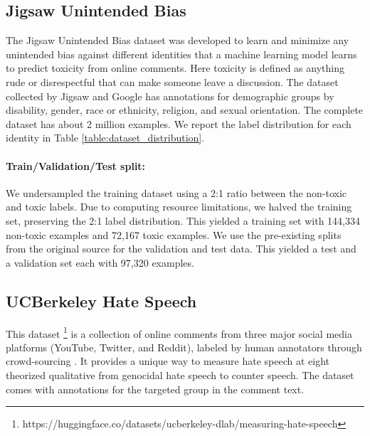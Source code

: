 \documentclass[11pt]{article} %
\begin{document}
\subsection{Jigsaw Unintended Bias}
The Jigsaw Unintended Bias dataset was developed to learn and minimize any unintended bias against different identities that a machine learning model learns to predict toxicity \cite{jigsaw-unintended-bias-in-toxicity-classification} from online comments. Here toxicity is defined as anything rude or disrespectful that can make someone leave a discussion.  The dataset collected by Jigsaw and Google has annotations for demographic groups by disability, gender, race or ethnicity, religion, and sexual orientation. The complete dataset has about 2 million examples. We report the label distribution for each identity in Table \ref{table:dataset_distribution}.

\paragraph{Train/Validation/Test split:}

We undersampled the training dataset using a 2:1 ratio between the non-toxic and toxic labels. Due to computing resource limitations, we halved the training set, preserving the 2:1 label distribution. This yielded a training set with 144,334 non-toxic examples and 72,167 toxic examples. We use the pre-existing splits from the original source for the validation and test data. This yielded a test and a validation set each with 97,320 examples. 

\subsection{UCBerkeley Hate Speech}
This dataset \footnote{https://huggingface.co/datasets/ucberkeley-dlab/measuring-hate-speech} is a collection of online comments from three major social media platforms (YouTube, Twitter, and Reddit), labeled by human annotators through crowd-sourcing \cite{kennedy2020constructing}. It provides a unique way to measure hate speech at eight theorized qualitative from genocidal hate speech to counter speech. The dataset comes with annotations for the targeted group in the comment text.

\end{document}
